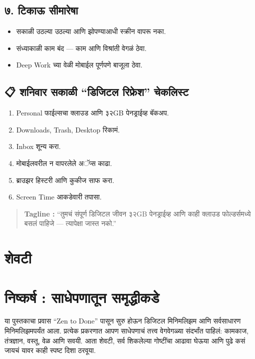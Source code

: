 \section*{७. टिकाऊ सीमारेषा}

\begin{itemize}
  \item सकाळी उठल्या उठल्या आणि झोपण्याआधी स्क्रीन वापरू नका.  
  \item संध्याकाळी काम बंद — काम आणि विश्रांती वेगळं ठेवा.  
  \item Deep Work च्या वेळी मोबाईल पूर्णपणे बाजूला ठेवा.  
\end{itemize}

\section*{📋 शनिवार सकाळी “डिजिटल रिफ्रेश” चेकलिस्ट}
\begin{enumerate}
  \item Personal फाईल्सचा क्लाउड आणि ३२GB पेनड्राईव्ह बॅकअप.  
  \item Downloads, Trash, Desktop रिकामं.  
  \item Inbox शून्य करा.  
  \item मोबाईलवरील न वापरलेले अॅप्स काढा.  
  \item ब्राउझर हिस्टरी आणि कुकीज साफ करा.  
  \item Screen Time आकडेवारी तपासा.  
\end{enumerate}

\begin{quote}
\textbf{Tagline :} “तुमचं संपूर्ण डिजिटल जीवन ३२GB पेनड्राईव्ह आणि काही क्लाउड फोल्डर्समध्ये बसलं पाहिजे — त्यापेक्षा जास्त नको.”  
\end{quote}


\chapter*{शेवटी }

\chapter{निष्कर्ष : साधेपणातून समृद्धीकडे}

या पुस्तकाचा प्रवास “Zen to Done” पासून सुरु होऊन डिजिटल मिनिमलिझम आणि सर्वसाधारण मिनिमलिझमपर्यंत आला. प्रत्येक प्रकरणात आपण साधेपणाचं तत्त्व वेगवेगळ्या संदर्भांत पाहिलं: कामकाज, तंत्रज्ञान, वस्तू, वेळ आणि सवयी. आता शेवटी, सर्व शिकलेल्या गोष्टींचा आढावा घेऊया आणि पुढे कसं जायचं यावर काही स्पष्ट दिशा ठरवूया.  

